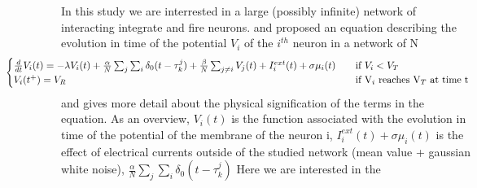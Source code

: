 In this study we are interrested in a large (possibly infinite) network of interacting integrate and fire neurons. \cite{lewis_dynamics_2003} and \cite{ostojic_synchronization_2009} proposed an equation describing the evolution in time of the potential $V_i$ of the $i^{th}$ neuron in a network of N
	\begin{equation}
		\hspace*{-2cm} \begin{cases}
			\frac{d}{dt}V_i(t)=-\lambda V_i(t)+\frac{\alpha}{N}\sum_j\sum_i\delta_0(t-\tau_k^j)+\frac{\beta}{N}\sum_{j\neq i}V_j(t)+I_i^{ext}(t)+\sigma\mu_i(t) &\quad\text{if }V_i<V_T\\
			V_i(t^+)=V_R & \quad\text{if V}_i\text{ reaches V}_T\text{ at time t}\\
		\end{cases}
	\end{equation}
\cite{ostojic_synchronization_2009} and \cite{delarue:hal-00747565} gives more detail about the physical signification of the terms in the equation. As an overview, $V_i(t)$ is the function associated with the evolution in time of the potential of the membrane of the neuron i, $I_i^{ext}(t)+\sigma\mu_i(t)$ is the effect of electrical currents outside of the studied network (mean value + gaussian white noise), $\frac{\alpha}{N}\sum_j\sum_i\delta_0(t-\tau_k^j)$ 
Here we are interested in the 



